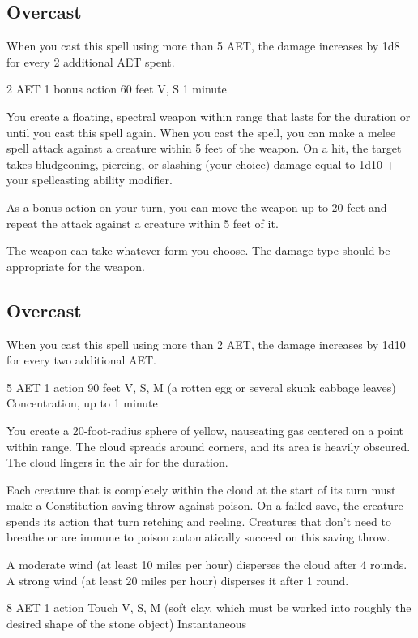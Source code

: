 \subsection*{Overcast} When you cast this spell using more than 5 AET, the damage increases by 1d8 for every 2 additional AET spent.


{2 AET}
{1 bonus action}
{60 feet}
{V, S}
{1 minute}

You create a floating, spectral weapon within range that lasts for the duration or until you cast this spell again. When you cast the spell, you can make a melee spell attack against a creature within 5 feet of the weapon. On a hit, the target takes bludgeoning, piercing, or slashing (your choice) damage equal to 1d10 + your spellcasting ability modifier.

As a bonus action on your turn, you can move the weapon up to 20 feet and repeat the attack against a creature within 5 feet of it.

The weapon can take whatever form you choose. The damage type should be appropriate for the weapon.

\subsection*{Overcast} When you cast this spell using more than 2 AET, the damage increases by 1d10 for every two additional AET.


{5 AET}
{1 action}
{90 feet}
{V, S, M (a rotten egg or several skunk cabbage leaves)}
{Concentration, up to 1 minute}

You create a 20-foot-radius sphere of yellow, nauseating gas centered on a point within range. The cloud spreads around corners, and its area is heavily obscured. The cloud lingers in the air for the duration.

Each creature that is completely within the cloud at the start of its turn must make a Constitution saving throw against poison. On a failed save, the creature spends its action that turn retching and reeling. Creatures that don't need to breathe or are immune to poison automatically succeed on this saving throw.

A moderate wind (at least 10 miles per hour) disperses the cloud after 4 rounds. A strong wind (at least 20 miles per hour) disperses it after 1 round.


{8 AET}
{1 action}
{Touch}
{V, S, M (soft clay, which must be worked into roughly the desired shape of the stone object)}
{Instantaneous}


